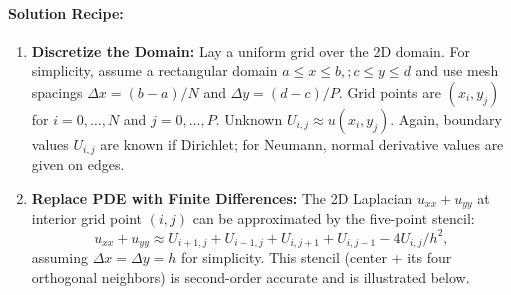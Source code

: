 \documentclass[a4paper,11pt]{report}
\begin{document}
\paragraph{Solution Recipe:}
\begin{enumerate}
    \item \textbf{Discretize the Domain:} Lay a uniform grid over the 2D domain. For simplicity, assume a rectangular domain ${a \le x \le b,; c \le y \le d}$ and use mesh spacings $\Delta x = (b-a)/N$ and $\Delta y = (d-c)/P$. Grid points are $(x_i, y_j)$ for $i=0,\dots,N$ and $j=0,\dots,P$. Unknown $U_{i,j} \approx u(x_i,y_j)$. Again, boundary values $U_{i,j}$ are known if Dirichlet; for Neumann, normal derivative values are given on edges.
    \item \textbf{Replace PDE with Finite Differences:} The 2D Laplacian $u_{xx}+u_{yy}$ at interior grid point $(i,j)$ can be approximated by the five-point stencil:
          $$
              u_{xx}+u_{yy}\approx U_{i+1,j}+U_{i-1,j}+U_{i,j+1}+U_{i,j-1}-4U_{i,j}/h^2,
          $$
          assuming $\Delta x = \Delta y = h$ for simplicity\cite{leifh}.
          This stencil (center + its four orthogonal neighbors) is second-order accurate and is illustrated below.
          \begin{figure}[H]
              \centering
\end{figure}
\end{enumerate}
\end{document}
